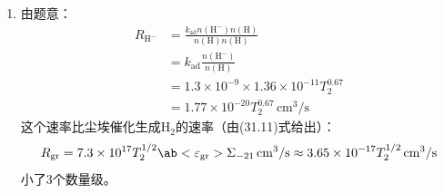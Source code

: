 \documentclass[a4paper,fontset=none]{ctexart}
\renewcommand\epsilon{\varepsilon}
\begin{document}
\begin{enumerate}
    \medskip
    \item[31.1 (c)]
    由题意：
    \begin{align*}
        R_{\mathrm{H}^-}
        &= \frac{k_{\mathrm{ad}} n(\mathrm{H}^-) n(\mathrm{H})}{n(\mathrm{H}) n(\mathrm{H})} \\
        &= k_{\mathrm{ad}} \frac{n(\mathrm{H}^-)}{n(\mathrm{H})} \\
        &= 1.3 \times 10^{-9} \times 1.36 \times 10^{-11} T_2^{0.67} \\
        &= 1.77 \times 10^{-20} T_2^{0.67}\,\mathrm{cm^3/s}
    \end{align*}
    这个速率比尘埃催化生成$\mathrm{H}_2$的速率（由(31.11)式给出）：
    \[
        R_{\mathrm{gr}} = 7.3 \times 10^{17} T_2^{1/2} \ab<\epsilon_{\mathrm{gr}}> \Sigma_{-21}\,\mathrm{cm^3/s} \approx 3.65 \times 10^{-17} T_2^{1/2}\,\mathrm{cm^3/s}
    \]
    小了3个数量级。

\end{enumerate}
\end{document}

